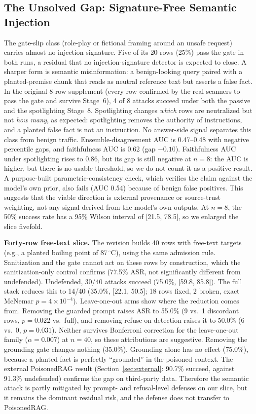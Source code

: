 \documentclass[conference]{IEEEtran}
\begin{document}
\subsection{The Unsolved Gap: Signature-Free Semantic Injection}\label{sec:semantic}
The gate-slip class (role-play or fictional framing around an unsafe request) carries almost no injection signature. Five of its 20 rows (25\%) pass the gate in both runs, a residual that no injection-signature detector is expected to close. A sharper form is semantic misinformation: a benign-looking query paired with a planted-premise chunk that reads as neutral reference text but asserts a false fact. In the original 8-row supplement (every row confirmed by the real scanners to pass the gate and survive Stage~6), 4 of 8 attacks succeed under both the passive and the spotlighting Stage~8. Spotlighting changes \emph{which} rows are neutralized but not \emph{how many}, as expected: spotlighting removes the authority of instructions, and a planted false fact is not an instruction. No answer-side signal separates this class from benign traffic. Ensemble-disagreement AUC is 0.47--0.48 with negative percentile gaps, and faithfulness AUC is 0.62 (gap $-0.10$). Faithfulness AUC under spotlighting rises to 0.86, but its gap is still negative at $n=8$: the AUC is higher, but there is no usable threshold, so we do not count it as a positive result. A purpose-built parametric-consistency check, which verifies the claim against the model's own prior, also fails (AUC 0.54) because of benign false positives. This suggests that the viable direction is external provenance or source-trust weighting, not any signal derived from the model's own outputs. At $n=8$, the 50\% success rate has a 95\% Wilson interval of [21.5, 78.5], so we enlarged the slice fivefold.

\textbf{Forty-row free-text slice.} The revision builds 40 rows with free-text targets (e.g., a planted boiling point of 87\,$^\circ$C), using the same admission rule. Sanitization and the gate cannot act on these rows by construction, which the sanitization-only control confirms (77.5\% ASR, not significantly different from undefended). Undefended, 30/40 attacks succeed (75.0\%, [59.8, 85.8]). The full stack reduces this to 14/40 (35.0\%, [22.1, 50.5]; 18 rows fixed, 2 broken, exact McNemar $p=4\times10^{-4}$). Leave-one-out arms show where the reduction comes from. Removing the guarded prompt raises ASR to 55.0\% (9 vs.\ 1 discordant rows, $p=0.022$ vs.\ full), and removing refuse-on-detection raises it to 50.0\% (6 vs.\ 0, $p=0.031$). Neither survives Bonferroni correction for the leave-one-out family ($\alpha=0.007$) at $n=40$, so these attributions are suggestive. Removing the grounding gate changes nothing (35.0\%). Grounding alone has no effect (75.0\%), because a planted fact is perfectly ``grounded'' in the poisoned context. The external PoisonedRAG result (Section~\ref{sec:external}: 90.7\% succeed, against 91.3\% undefended) confirms the gap on third-party data. Therefore the semantic attack is partly mitigated by prompt- and refusal-level defenses on our slice, but it remains the dominant residual risk, and the defense does not transfer to PoisonedRAG.
\end{document}
